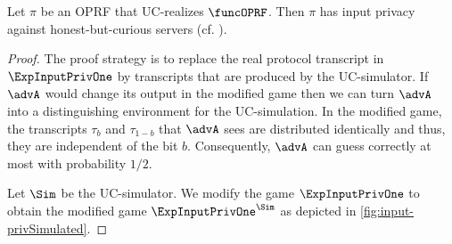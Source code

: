 \begin{lemma}
    \label{lem:UCinputpriv}
    Let $\pi$ be an OPRF that UC-realizes $\funcOPRF$. Then $\pi$ has input privacy against honest-but-curious servers (cf. ).
\end{lemma}
\begin{proof}
    The proof strategy is to replace the real protocol transcript in $\ExpInputPrivOne$ by transcripts that are produced by the UC-simulator. If $\advA$ would change its output in the modified game then we can turn $\advA$ into a distinguishing environment for the UC-simulation. In the modified game, the transcripts $\tau_b$ and $\tau_{1-b}$ that $\advA$ sees are distributed identically and thus, they are independent of the bit $b$. Consequently, $\advA$ can guess correctly at most with probability $1/2$.
    
    Let $\Sim$ be the UC-simulator. We modify the game $\ExpInputPrivOne$ to obtain the modified game $\ExpInputPrivOne^\Sim$ as depicted in \cref{fig:input-privSimulated}.


\end{proof}
